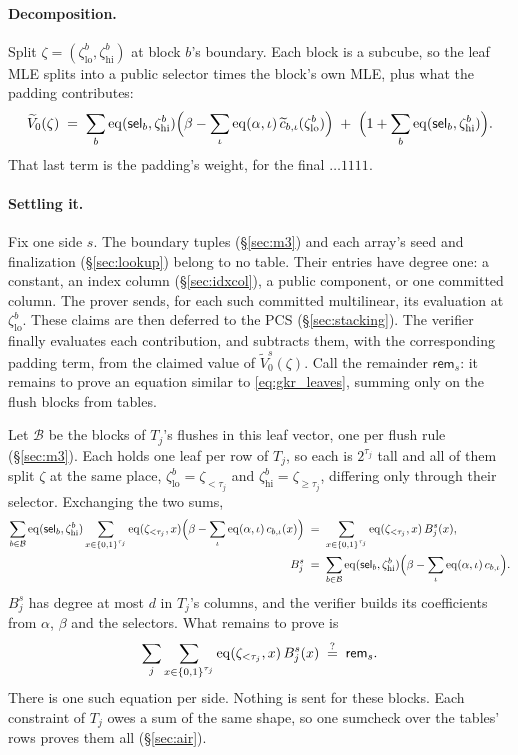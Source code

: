 \paragraph{Decomposition.} Split $\zeta=(\zeta^{b}_{\mathrm{lo}},\zeta^{b}_{\mathrm{hi}})$ at block $b$'s boundary. Each block is a subcube, so the leaf MLE splits into a public selector times the block's own MLE, plus what the padding contributes:
\begin{equation}\label{eq:gkr_leaves}
  \widetilde V_0(\zeta)\;=\;\sum_b \operatorname{eq}(\mathsf{sel}_b,\zeta^{b}_{\mathrm{hi}})\Bigl(\beta-\sum_{\iota}\operatorname{eq}(\alpha,\iota)\,\widetilde c_{b,\iota}(\zeta^{b}_{\mathrm{lo}})\Bigr)\;+\;\Bigl(1+\sum_b\operatorname{eq}(\mathsf{sel}_b,\zeta^{b}_{\mathrm{hi}})\Bigr).
\end{equation}
That last term is the padding's weight, for the final $\dots 1111$.

\paragraph{Settling it.} Fix one side $s$. The boundary tuples (\S\ref{sec:m3}) and each array's seed and finalization (\S\ref{sec:lookup}) belong to no table. Their entries have degree one: a constant, an index column (\S\ref{sec:idxcol}), a public component, or one committed column. The prover sends, for each such committed multilinear, its evaluation at $\zeta^{b}_{\mathrm{lo}}$. These claims are then deferred to the PCS (\S\ref{sec:stacking}). The verifier finally evaluates each contribution, and subtracts them, with the corresponding padding term, from the claimed value of $\widetilde V^{s}_0(\zeta)$. Call the remainder $\mathsf{rem}_{s}$: it remains to prove an equation similar to \eqref{eq:gkr_leaves}, summing only on the flush blocks from tables.

Let $\mathcal B$ be the blocks of $T_j$'s flushes in this leaf vector, one per flush rule (\S\ref{sec:m3}). Each holds one leaf per row of $T_j$, so each is $2^{\tau_j}$ tall and all of them split $\zeta$ at the same place, $\zeta^{b}_{\mathrm{lo}}=\zeta_{<\tau_j}$ and $\zeta^{b}_{\mathrm{hi}}=\zeta_{\ge\tau_j}$, differing only through their selector. Exchanging the two sums,
\begin{align*}
  \sum_{b\in\mathcal B}\operatorname{eq}(\mathsf{sel}_b,\zeta^{b}_{\mathrm{hi}})\sum_{x\in\{0,1\}^{\tau_j}}\operatorname{eq}(\zeta_{<\tau_j},x)\Bigl(\beta-\sum_{\iota}\operatorname{eq}(\alpha,\iota)\,c_{b,\iota}(x)\Bigr)
  &\;=\;\sum_{x\in\{0,1\}^{\tau_j}}\operatorname{eq}(\zeta_{<\tau_j},x)\,B^{s}_j(x),\\
  B^{s}_j&\;=\;\sum_{b\in\mathcal B}\operatorname{eq}(\mathsf{sel}_b,\zeta^{b}_{\mathrm{hi}})\Bigl(\beta-\sum_\iota\operatorname{eq}(\alpha,\iota)\,c_{b,\iota}\Bigr).
\end{align*}
$B^{s}_j$ has degree at most $d$ in $T_j$'s columns, and the verifier builds its coefficients from $\alpha$, $\beta$ and the selectors. What remains to prove is
\[
  \sum_j\sum_{x\in\{0,1\}^{\tau_j}}\operatorname{eq}(\zeta_{<\tau_j},x)\,B^{s}_j(x)\;\stackrel{?}{=}\;\mathsf{rem}_{s} .
\]
There is one such equation per side. Nothing is sent for these blocks. Each constraint of $T_j$ owes a sum of the same shape, so one sumcheck over the tables' rows proves them all (\S\ref{sec:air}).

